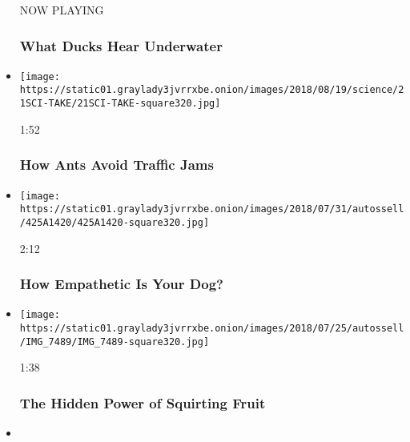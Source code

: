 \begin{itemize}
  NOW PLAYING

  \hypertarget{what-ducks-hear-underwater-2}{%
  \subsubsection{What Ducks Hear
  Underwater}\label{what-ducks-hear-underwater-2}}
\item
  \href{https://www.nytimes3xbfgragh.onion/video/science/100000006037692/how-ants-avoid-traffic-jams.html?action=click\&module=video-series-bar\&region=header\&pgtype=Article\&playlistId=video/sciencetake}{}

  \texttt{[image: https://static01.graylady3jvrrxbe.onion/images/2018/08/19/science/21SCI-TAKE/21SCI-TAKE-square320.jpg]}

  1:52

  \hypertarget{how-ants-avoid-traffic-jams}{%
  \subsubsection{How Ants Avoid Traffic
  Jams}\label{how-ants-avoid-traffic-jams}}
\item
  \href{https://www.nytimes3xbfgragh.onion/video/science/100000006018081/how-empathetic-is-your-dog.html?action=click\&module=video-series-bar\&region=header\&pgtype=Article\&playlistId=video/sciencetake}{}

  \texttt{[image: https://static01.graylady3jvrrxbe.onion/images/2018/07/31/autossell/425A1420/425A1420-square320.jpg]}

  2:12

  \hypertarget{how-empathetic-is-your-dog}{%
  \subsubsection{How Empathetic Is Your
  Dog?}\label{how-empathetic-is-your-dog}}
\item
  \href{https://www.nytimes3xbfgragh.onion/video/science/100000005998094/the-hidden-power-of-squirting-fruit.html?action=click\&module=video-series-bar\&region=header\&pgtype=Article\&playlistId=video/sciencetake}{}

  \texttt{[image: https://static01.graylady3jvrrxbe.onion/images/2018/07/25/autossell/IMG\_7489/IMG\_7489-square320.jpg]}

  1:38

  \hypertarget{the-hidden-power-of-squirting-fruit}{%
  \subsubsection{The Hidden Power of Squirting
  Fruit}\label{the-hidden-power-of-squirting-fruit}}
\item
  \href{https://www.nytimes3xbfgragh.onion/video/science/100000005948406/how-spiders-use-silk-to-fly.html?action=click\&module=video-series-bar\&region=header\&pgtype=Article\&playlistId=video/sciencetake}{}


\end{itemize}
